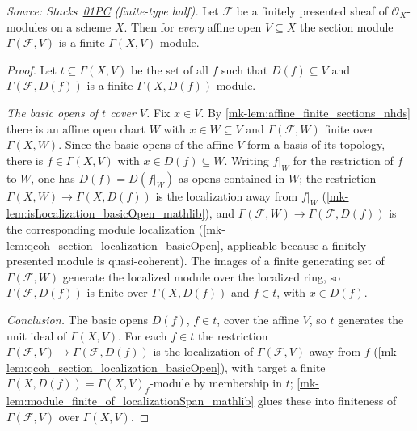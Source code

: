 \begin{lemma}\label{mk-lem:finite_sections_affine_all}
  \leanok

  \textit{Source: Stacks~\href{https://stacks.math.columbia.edu/tag/01PC}{01PC}
  (finite-type half).}
  Let \(\mathcal{F}\) be a finitely presented sheaf of
  \(\mathcal{O}_X\)-modules on a scheme \(X\).  Then for \emph{every} affine
  open \(V \subseteq X\) the section module \(\Gamma(\mathcal{F}, V)\) is a
  finite \(\Gamma(X, V)\)-module.
\end{lemma}
\begin{proof}
  \leanok{}
  Let \(t \subseteq \Gamma(X, V)\) be the set of all \(f\) such that
  \(D(f) \subseteq V\) and \(\Gamma(\mathcal{F}, D(f))\) is a finite
  \(\Gamma(X, D(f))\)-module.

  \emph{The basic opens of \(t\) cover \(V\).}  Fix \(x \in V\).  By
  \ref{mk-lem:affine_finite_sections_nhds} there is an affine open chart \(W\)
  with \(x \in W \subseteq V\) and \(\Gamma(\mathcal{F}, W)\) finite over
  \(\Gamma(X, W)\).  Since the basic opens of the affine \(V\) form a basis of
  its topology, there is \(f \in \Gamma(X, V)\) with
  \(x \in D(f) \subseteq W\).  Writing \(f|_W\) for the restriction of \(f\)
  to \(W\), one has \(D(f) = D(f|_W)\) as opens contained in \(W\); the
  restriction \(\Gamma(X, W) \to \Gamma(X, D(f))\) is the localization away
  from \(f|_W\) (\ref{mk-lem:isLocalization_basicOpen_mathlib}), and
  \(\Gamma(\mathcal{F}, W) \to \Gamma(\mathcal{F}, D(f))\) is the
  corresponding module localization
  (\ref{mk-lem:qcoh_section_localization_basicOpen}, applicable because a
  finitely presented module is quasi-coherent).  The images of a finite
  generating set of \(\Gamma(\mathcal{F}, W)\) generate the localized module
  over the localized ring, so \(\Gamma(\mathcal{F}, D(f))\) is finite over
  \(\Gamma(X, D(f))\) and \(f \in t\), with \(x \in D(f)\).

  \emph{Conclusion.}  The basic opens \(D(f)\), \(f \in t\), cover the affine
  \(V\), so \(t\) generates the unit ideal of \(\Gamma(X, V)\).  For each
  \(f \in t\) the restriction
  \(\Gamma(\mathcal{F}, V) \to \Gamma(\mathcal{F}, D(f))\) is the localization
  of \(\Gamma(\mathcal{F}, V)\) away from \(f\)
  (\ref{mk-lem:qcoh_section_localization_basicOpen}), with target a finite
  \(\Gamma(X, D(f)) = \Gamma(X, V)_f\)-module by membership in \(t\);
  \ref{mk-lem:module_finite_of_localizationSpan_mathlib} glues these into
  finiteness of \(\Gamma(\mathcal{F}, V)\) over \(\Gamma(X, V)\).
\end{proof}

